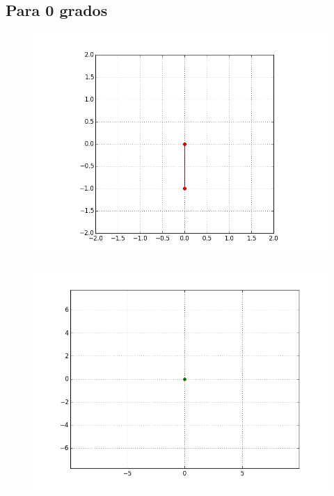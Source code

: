 \documentclass[12pt]{article}
\begin{document}
\subsection{ Para 0 grados}
\begin{figure}[H]
\includegraphics[scale=.6]{0p}
\end{figure}
\begin{figure}[H]
\includegraphics[scale=.6]{0e}
\end{figure}
\end{document}
